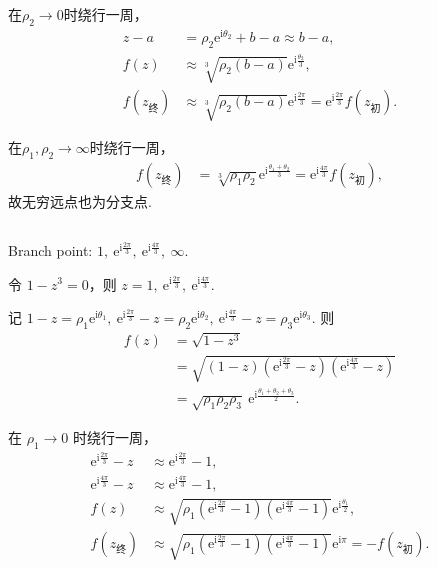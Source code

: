\documentclass[12pt]{article}
\newcommand{\mrm}[1]{\mathrm{#1}}
\begin{document}
在$\rho_2\to0$时绕行一周，
\begin{align*}
z-a &= \rho_2 \mrm e^{\mathrm{i}\theta_2} + b-a \approx b-a, \\
f(z) &\approx \sqrt[3]{\rho_2(b-a)} \mrm e^{\mathrm{i}\frac{\theta_2}{3}}, \\
f(z_{\text{终}}) &\approx \sqrt[3]{\rho_2(b-a)} \mrm e^{\mathrm{i}\frac{2\pi}{3}} = \mrm e^{\mathrm{i}\frac{2\pi}{3}} f(z_{\text{初}}).
\end{align*}

在$\rho_1,\rho_2\to\infty$时绕行一周，
\begin{align*}
f(z_{\text{终}}) &= \sqrt[3]{\rho_1\rho_2} \mrm e^{\mathrm{i}\frac{\theta_1+\theta_2}{3}} = \mrm e^{\mathrm{i}\frac{4\pi}{3}} f(z_{\text{初}}),
\end{align*}
故无穷远点也为分支点.
\subsection{}
Branch point: \(1,\ \mathrm{e}^{\mathrm{i}\frac{2\pi}{3}},\ \mathrm{e}^{\mathrm{i}\frac{4\pi}{3}},\ \infty\).

令 \(1-z^3=0\)，则 \(z=1,\ \mathrm{e}^{\mathrm{i}\frac{2\pi}{3}},\ \mathrm{e}^{\mathrm{i}\frac{4\pi}{3}}\).

记 \(1-z=\rho_1 \mathrm{e}^{\mathrm{i}\theta_1},\ \mathrm{e}^{\mathrm{i}\frac{2\pi}{3}}-z=\rho_2 \mathrm{e}^{\mathrm{i}\theta_2},\ \mathrm{e}^{\mathrm{i}\frac{4\pi}{3}}-z=\rho_3 \mathrm{e}^{\mathrm{i}\theta_3}\).
则
\begin{align*}
f(z) &= \sqrt{1-z^3} \\
&= \sqrt{(1-z)\left(\mathrm{e}^{\mathrm{i}\frac{2\pi}{3}}-z\right)\left(\mathrm{e}^{\mathrm{i}\frac{4\pi}{3}}-z\right)} \\
&= \sqrt{\rho_1\rho_2\rho_3}\ \mathrm{e}^{\mathrm{i}\frac{\theta_1+\theta_2+\theta_3}{2}}.
\end{align*}

在 \(\rho_1\to0\) 时绕行一周，
\begin{align*}
\mathrm{e}^{\mathrm{i}\frac{2\pi}{3}}-z &\approx \mathrm{e}^{\mathrm{i}\frac{2\pi}{3}}-1, \\
\mathrm{e}^{\mathrm{i}\frac{4\pi}{3}}-z &\approx \mathrm{e}^{\mathrm{i}\frac{4\pi}{3}}-1, \\
f(z) &\approx \sqrt{\rho_1\left(\mathrm{e}^{\mathrm{i}\frac{2\pi}{3}}-1\right)\left(\mathrm{e}^{\mathrm{i}\frac{4\pi}{3}}-1\right)} \mathrm{e}^{\mathrm{i}\frac{\theta_1}{2}}, \\
f(z_{\text{终}}) &\approx \sqrt{\rho_1\left(\mathrm{e}^{\mathrm{i}\frac{2\pi}{3}}-1\right)\left(\mathrm{e}^{\mathrm{i}\frac{4\pi}{3}}-1\right)} \mathrm{e}^{\mathrm{i}\pi} = -f(z_{\text{初}}).
\end{align*}
\end{document}
